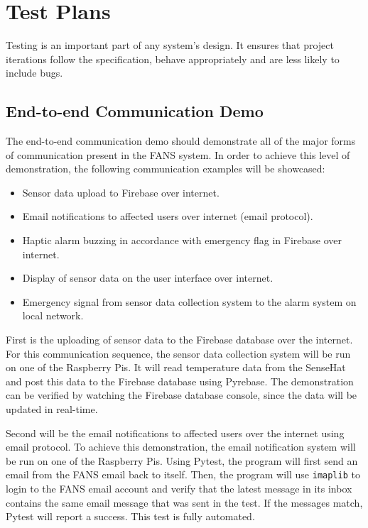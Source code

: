 \section{Test Plans}

Testing is an important part of any system's design. It ensures that project iterations follow the specification,
behave appropriately and are less likely to include bugs.

\subsection{End-to-end Communication Demo}

The end-to-end communication demo should demonstrate all of the major forms of communication present in the FANS
system. In order to achieve this level of demonstration, the following communication examples will be showcased:

\begin{itemize}
    \item Sensor data upload to Firebase over internet.
    \item Email notifications to affected users over internet (email protocol).
    \item Haptic alarm buzzing in accordance with emergency flag in Firebase over internet.
    \item Display of sensor data on the user interface over internet.
    \item Emergency signal from sensor data collection system to the alarm system on local network.
\end{itemize}

First is the uploading of sensor data to the Firebase database over the internet. For this communication sequence, the
sensor data collection system will be run on one of the Raspberry Pis. It will read temperature data from the SenseHat
and post this data to the Firebase database using Pyrebase. The demonstration can be verified by watching the Firebase
database console, since the data will be updated in real-time.

Second will be the email notifications to affected users over the internet using email protocol. To achieve this
demonstration, the email notification system will be run on one of the Raspberry Pis. Using Pytest, the program will
first send an email from the FANS email back to itself. Then, the program will use \texttt{imaplib} to login to the
FANS email account and verify that the latest message in its inbox contains the same email message that was sent in the
test. If the messages match, Pytest will report a success. This test is fully automated.

